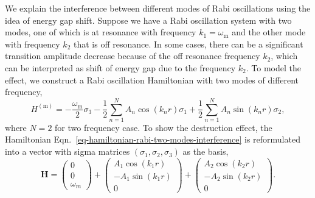 


We explain the interference between different modes of Rabi oscillations using the idea of energy gap shift. Suppose we have a Rabi oscillation system with two modes, one of which is at resonance with frequency $k_1=\omega_{\mathrm m}$ and the other mode with frequency $k_2$ that is off resonance. In some cases, there can be a significant transition amplitude decrease because of the off resonance frequency $k_2$, which can be interpreted as shift of energy gap due to the frequency $k_2$. To model the effect, we construct a Rabi oscillation Hamiltonian with two modes of different frequency,
\begin{equation}
H^{(\mathrm{m})}  = -\frac{\omega_{\mathrm{m}}}{2} \sigma_3 - \frac{1}{2} \sum_{n=1}^N  A_n \cos (k_n r) \sigma_1 + \frac{1}{2} \sum_{n=1}^N  A_n \sin (k_n r) \sigma_2,
\label{eq-hamiltonian-rabi-two-modes-interference}
\end{equation}
where $N=2$ for two frequency case. To show the destruction effect, the Hamiltonian Eqn.~\ref{eq-hamiltonian-rabi-two-modes-interference} is reformulated into a vector with sigma matrices $(\sigma_1,\sigma_2,\sigma_3)$ as the basis,
\begin{equation}
\mathbf H = \begin{pmatrix}
0\\
0\\
\omega_m
\end{pmatrix} + \begin{pmatrix}
A_1 \cos (k_1 r)\\
-A_1 \sin (k_1 r)\\
0
\end{pmatrix} + \begin{pmatrix}
A_2 \cos (k_2 r)\\
-A_2 \sin (k_2 r)\\
0
\end{pmatrix}.
\end{equation}

